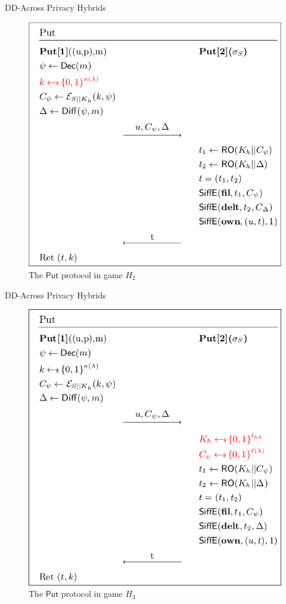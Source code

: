 \documentclass{beamer}
\begin{document}
\begin{frame}{DD-Across Privacy Hybrids}
    \begin{figure}[H]
      \centering
      \includegraphics[scale=0.3]{H2}
      \caption{The $\mathsf{Put}$ protocol in game $H_2$}
    \end{figure}
\end{frame}

\begin{frame}{DD-Across Privacy Hybrids}
    \begin{figure}[H]
      \centering
      \includegraphics[scale=0.3]{H3}
      \caption{The $\mathsf{Put}$ protocol in game $H_3$}
    \end{figure}
\end{frame}
\end{document}
